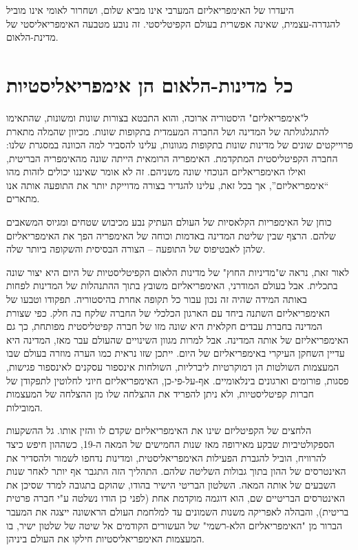 היעדרו של האימפריאליזם המערבי אינו מביא שלום, ושחרור לאומי אינו מוביל להגדרה-עצמית, שאינה אפשרית בעולם הקפיטליסטי. זה נובע מטבעה האימפריאליסטי של מדינת-הלאום.



\section{כל מדינות-הלאום הן אימפריאליסטיות}

ל"אימפריאליזם" היסטוריה ארוכה, והוא התבטא בצורות שונות ומשונות, שהתאימו להתגלגולתה של המדינה ושל החברה המעמדית בתקופות שונות. מכיוון שהמלה מתארת פרוייקטים שונים של מדינות שונות בתקופות מגוונות, עלינו להסביר למה הכוונה במסגרת שלנו: החברה הקפיטליסטית המתקדמת. האימפריה הרומאית הייתה שונה מהאימפריה הבריטית, ואילו האימפריאליזם הנוכחי שונה משניהם. זה לא אומר שאיננו יכולים לזהות מהו “אימפריאליזם”, אך בכל זאת, עלינו להגדיר בצורה מדוייקת יותר את התופעה אותה אנו מתארים.

כוחן של האימפריות הקלאסיות של העולם העתיק נבע מכיבוש שטחים ומגיוס המשאבים שלהם. הרצף שבין שליטת המדינה באדמות וכוחה של האימפריה הפך את האימפריאליזם שלהן לאבטיפוס של התופעה – הצורה הבסיסית והשקופה ביותר שלה.

לאור זאת, נראה ש"מדיניות החוץ" של מדינות הלאום הקפיטליסטיות של היום היא יצור שונה בתכלית. אבל בעולם המודרני, האימפריאליזם משובץ בתוך ההתנהלות של המדינות לפחות באותה המידה שהיה זה נכון עבור כל תקופה אחרת בהיסטוריה. תפקודו וטבעו של האימפריאליזם השתנה ביחד עם הארגון הכלכלי של החברה שלקח בה חלק. כפי שצורת המדינה בחברת עבדים חקלאית היא שונה מזו של חברה קפיטליסטית מפותחת, כך גם האימפריאליזם של אותה המדינה. אבל למרות מגוון השינויים שהעולם עבר מאז, המדינה היא עדיין השחקן העיקרי באימפריאליזם של היום. ייתכן שזו נראית כמו הערה מוזרה בעולם שבו המעצמות השולטות הן דמוקרטיות ליברליות, השולחות אינספור עסקנים לאינספור פגישות, פסגות, פורומים וארגונים בינלאומיים. אף-על-פי-כן, האימפריאליזם חיוני לחלוטין לתפקודן של חברות קפיטליסטיות, ולא ניתן להפריד את ההצלחה שלו מן ההצלחה של המעצמות המובילות.

הלחצים של הקפיטליזם שינו את האימפריאליזם שקדם לו והזין אותו. גל ההשקעות הספקולטיביות שבקע מאירופה מאז שנות החמישים של המאה ה-19, כשההון חיפש כיצד להרוויח, הוביל להגברת הפעילות האימפריאליסטית, ומדינות נדחפו לשמור ולהסדיר את האינטרסים של ההון בתוך גבולות השליטה שלהם. התהליך הזה התגבר אף יותר לאחר שנות השבעים של אותה המאה. השלטון הבריטי הישיר בהודו, שהוקם בתגובה למרד שסיכן את האינטרסים הבריטיים שם, הוא דוגמה מוקדמת אחת (לפני כן הודו נשלטה ע"י חברה פרטית בריטית), והבהלה לאפריקה משנות השמונים עד למלחמת העולם הראשונה ייצגה את המעבר הברור מן "האימפריאליזם הלא-רשמי" של העשורים הקודמים אל שיטה של שלטון ישיר, בו המעצמות האימפריאליסטיות חילקו את העולם ביניהן.

